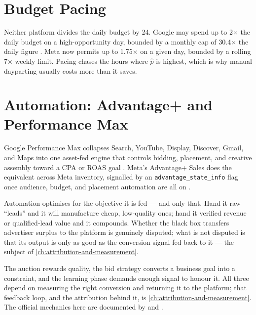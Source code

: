 \section{Budget Pacing}\label{sec:pacing}

Neither platform divides the daily budget by 24. Google may spend up to \num{2}$\times$ the daily budget on a high-opportunity day, bounded by a monthly cap of \num{30.4}$\times$ the daily figure \parencite{gads13685469,gads10486637}. Meta now permits up to \num{1.75}$\times$ on a given day, bounded by a rolling \num{7}$\times$ weekly limit. Pacing chases the hours where $\hat p$ is highest, which is why manual dayparting usually costs more than it saves.

\section{Automation: Advantage+ and Performance Max}\label{sec:automation}

Google Performance Max collapses Search, YouTube, Display, Discover, Gmail, and Maps into one asset-fed engine that controls bidding, placement, and creative assembly toward a CPA or ROAS goal \parencite{gads10724817,gads10724896}. Meta's Advantage+ Sales does the equivalent across Meta inventory, signalled by an \texttt{advantage\_state\_info} flag once audience, budget, and placement automation are all on \parencite{metadev-advantage-plus-campaign-}.

Automation optimises for the objective it is fed --- and only that. Hand it raw ``leads'' and it will manufacture cheap, low-quality ones; hand it verified revenue or qualified-lead value and it compounds. Whether the black box transfers advertiser surplus to the platform is genuinely disputed; what is not disputed is that its output is only as good as the conversion signal fed back to it --- the subject of \cref{ch:attribution-and-measurement}.

The auction rewards quality, the bid strategy converts a business goal into a constraint, and the learning phase demands enough signal to honour it. All three depend on measuring the right conversion and returning it to the platform; that feedback loop, and the attribution behind it, is \cref{ch:attribution-and-measurement}. The official mechanics here are documented by \textcite{gads1722122} and \textcite{metadev-advantage-campaigns}.
